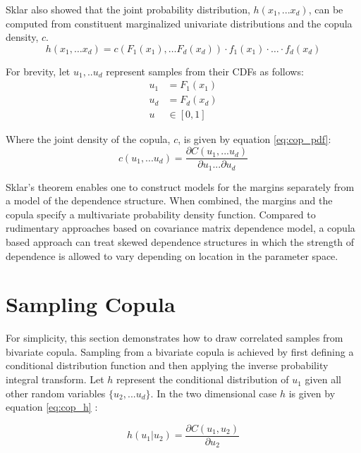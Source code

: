 Sklar also showed that the joint probability distribution, $h(x_1, ... x_d)$, can be computed from
constituent marginalized univariate distributions and the copula density, $c$.
\begin{equation}
h(x_1,\dots x_d)= c(F_1(x_1),\dots F_d(x_d))\cdot f_1(x_1)\cdot\dots\cdot f_d(x_d)
\label{eq:sklar2}
\end{equation}

For brevity, let $u_1, .. u_d$ represent samples from their CDFs as follows:
\begin{align*} u_1 &= F_1(x_1) \\ u_d &= F_d(x_d) \\ u &\in
[0, 1]
\end{align*}

Where the joint density of the copula, $c$, is given by equation \ref{eq:cop_pdf}:
\begin{equation}
c(u_1, ... u_d) = \frac{\partial C(u_1, ... u_d)}{\partial u_1 ... \partial u_d}
\label{eq:cop_pdf}
\end{equation}

Sklar's theorem enables one to construct
models for the margins separately from a model of the dependence structure.
When combined, the margins and the copula 
specify a multivariate probability density function.
Compared to rudimentary approaches based on covariance matrix dependence model,
a copula based approach can treat skewed dependence structures in which the
strength of dependence is allowed to vary depending on location in the parameter space.

\section*{Sampling Copula}
\label{sec:sampling_copula}

For simplicity, this section demonstrates how to draw correlated samples from bivariate copula.
Sampling from a bivariate copula is achieved by first defining a conditional distribution function and then applying the inverse probability integral transform.
Let $h$ represent the conditional distribution of $u_1$ given all other random variables $\{u_2, ... u_d\}$.  In the two dimensional case $h$ is given by equation \ref{eq:cop_h} \cite{Nelsen2006}:

\begin{equation}
h(u_1 | u_2) = \frac{\partial C(u_1, u_2)}{\partial u_2}
\label{eq:cop_h}
\end{equation}

